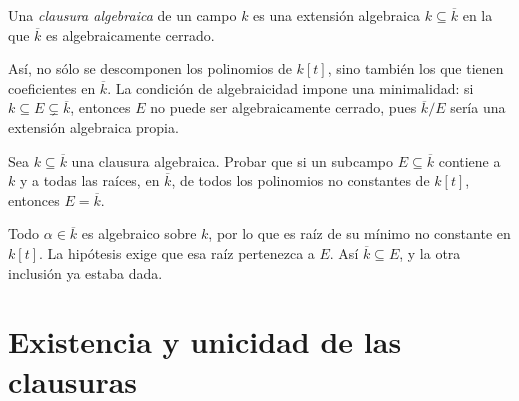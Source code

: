 \begin{defi}
Una \emph{clausura algebraica} de un campo $k$ es una extensión algebraica $k\subseteq\overline k$ en la que $\overline k$ es algebraicamente cerrado.
\end{defi}
Así, no sólo se descomponen los polinomios de $k[t]$, sino también los que tienen coeficientes en $\overline k$. La condición de algebraicidad impone una minimalidad: si $k\subseteq E\subsetneq\overline k$, entonces $E$ no puede ser algebraicamente cerrado, pues $\overline k/E$ sería una extensión algebraica propia.

\begin{ejer}\label{ejer:C24-raices-clausura}
Sea $k\subseteq\overline k$ una clausura algebraica. Probar que si un subcampo $E\subseteq\overline k$ contiene a $k$ y a todas las raíces, en $\overline k$, de todos los polinomios no constantes de $k[t]$, entonces $E=\overline k$.
\end{ejer}
\begin{sol}
Todo $\alpha\in\overline k$ es algebraico sobre $k$, por lo que es raíz de su mínimo no constante en $k[t]$. La hipótesis exige que esa raíz pertenezca a $E$. Así $\overline k\subseteq E$, y la otra inclusión ya estaba dada.
\end{sol}

\section{Existencia y unicidad de las clausuras}
